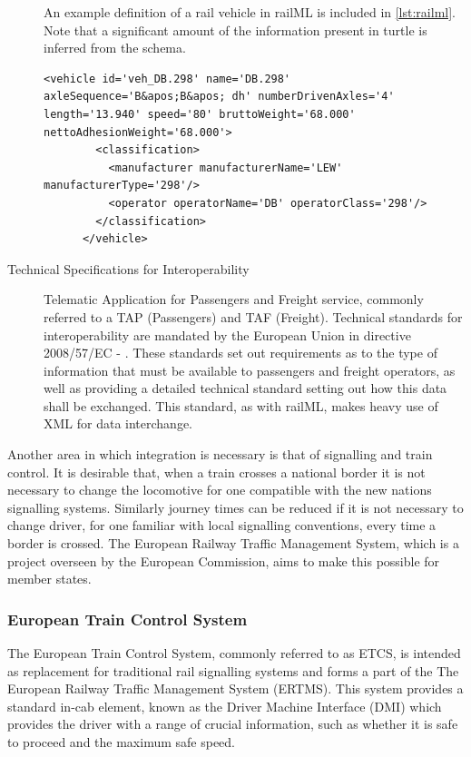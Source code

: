 \begin{description}
    \begin{minipage}{\textwidth}
    An example definition of a rail vehicle in railML is included in \autoref{lst:railml}. Note that a significant amount of the information present in turtle is inferred from the schema.
    \begin{lstlisting}[label={lst:railml},caption={A German rail locomotive, as defined in railML},frame=tb]
      <vehicle id='veh_DB.298' name='DB.298' axleSequence='B&apos;B&apos; dh' numberDrivenAxles='4' length='13.940' speed='80' bruttoWeight='68.000' nettoAdhesionWeight='68.000'>
        <classification>
          <manufacturer manufacturerName='LEW' manufacturerType='298'/>
          <operator operatorName='DB' operatorClass='298'/>
        </classification>
      </vehicle>
    \end{lstlisting}
    \end{minipage}
    \item[Technical Specifications for Interoperability] Telematic Application for Passengers and Freight service, commonly referred to a TAP (Passengers) and TAF (Freight). Technical standards for interoperability are mandated by the European Union in directive 2008/57/EC - \citet{CounciloftheEuropeanUnionq2008}. These standards set out requirements as to the type of information that must be available to passengers and freight operators, as well as providing a detailed technical standard setting out how this data shall be exchanged. This standard, as with railML, makes heavy use of XML for data interchange.  
\end{description}

Another area in which integration is necessary is that of signalling and train control. It is desirable that, when a train crosses a national border it is not necessary to change the locomotive for one compatible with the new nations signalling systems. Similarly journey times can be reduced if it is not necessary to change driver, for one familiar with local signalling conventions, every time a border is crossed. The European Railway Traffic Management System, which is a project overseen by the European Commission, aims to make this possible for member states.

\subsubsection{European Train Control System}
\label{sec:etcs}
The European Train Control System, commonly referred to as ETCS, is intended as replacement for traditional rail signalling systems and forms a part of the The European Railway Traffic Management System (ERTMS). This system provides a standard in-cab element, known as the Driver Machine Interface (DMI) which provides the driver with a range of crucial information, such as whether it is safe to proceed and the maximum safe speed. 


